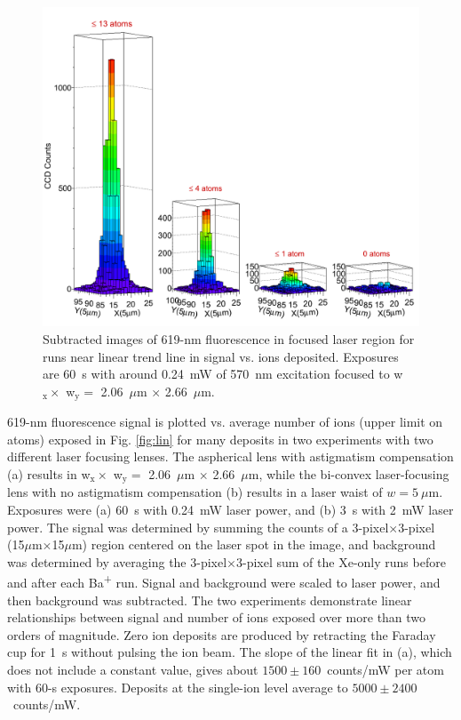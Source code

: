 \begin{figure} %
        \centering
                \includegraphics[width=.99\textwidth]{figures/train.png}
                \caption{Subtracted images of 619-nm fluorescence in focused laser region for runs near linear trend line in signal vs. ions deposited.  Exposures are 60~s with around 0.24~mW of 570~nm excitation focused to w$_{\text{x}} \times$ w$_{\text{y}} =$ 2.06~$\mu$m $\times$ 2.66~$\mu$m.}
\label{fig:train}
\end{figure}

619-nm fluorescence signal is plotted vs. average number of ions (upper limit on atoms) exposed in Fig. \ref{fig:lin} for many deposits in two experiments with two different laser focusing lenses.  The aspherical lens with astigmatism compensation (a) results in w$_{\text{x}} \times$ w$_{\text{y}} =$ 2.06~$\mu$m $\times$ 2.66~$\mu$m, while the bi-convex laser-focusing lens with no astigmatism compensation (b) results in a laser waist of $w = 5~\mu$m.  Exposures were (a) 60~s with 0.24~mW laser power, and (b) 3~s with 2~mW laser power.  The signal was determined by summing the counts of a 3-pixel$\times$3-pixel (15$\mu$m$\times$15$\mu$m) region centered on the laser spot in the image, and background was determined by averaging the 3-pixel$\times$3-pixel sum of the Xe-only runs before and after each Ba\textsuperscript{+} run.  Signal and background were scaled to laser power, and then background was subtracted.  The two experiments demonstrate linear relationships between signal and number of ions exposed over more than two orders of magnitude.  Zero ion deposits are produced by retracting the Faraday cup for 1~s without pulsing the ion beam.  The slope of the linear fit in (a), which does not include a constant value, gives about $1500 \pm 160$~counts/mW per atom with 60-s exposures.  Deposits at the single-ion level average to $5000 \pm 2400$~counts/mW.

